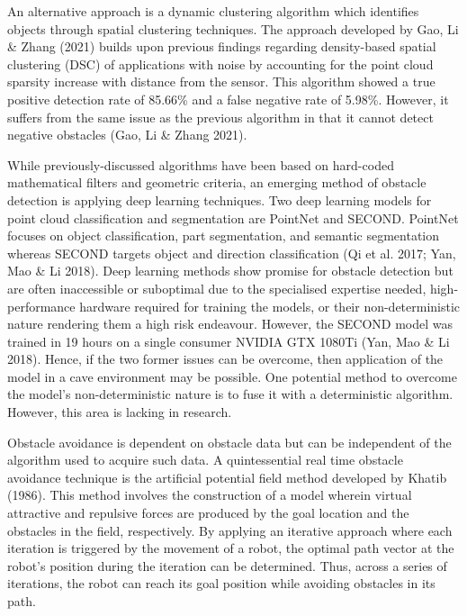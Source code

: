 An alternative approach is a dynamic clustering algorithm which identifies objects through spatial clustering techniques. The approach developed by Gao, Li \& Zhang (2021) builds upon previous findings regarding density-based spatial clustering (DSC) of applications with noise by accounting for the point cloud sparsity increase with distance from the sensor. This algorithm showed a true positive detection rate of 85.66\% and a false negative rate of 5.98\%. However, it suffers from the same issue as the previous algorithm in that it cannot detect negative obstacles (Gao, Li \& Zhang 2021).

While previously-discussed algorithms have been based on hard-coded mathematical filters and geometric criteria, an emerging method of obstacle detection is applying deep learning techniques. Two deep learning models for point cloud classification and segmentation are PointNet and SECOND. PointNet focuses on object classification, part segmentation, and semantic segmentation whereas SECOND targets object and direction classification (Qi et al. 2017; Yan, Mao \& Li 2018). Deep learning methods show promise for obstacle detection but are often inaccessible or suboptimal due to the specialised expertise needed, high-performance hardware required for training the models, or their non-deterministic nature rendering them a high risk endeavour. However, the SECOND model was trained in 19 hours on a single consumer NVIDIA GTX 1080Ti (Yan, Mao \& Li 2018). Hence, if the two former issues can be overcome, then application of the model in a cave environment may be possible. One potential method to overcome the model's non-deterministic nature is to fuse it with a deterministic algorithm. However, this area is lacking in research.  

Obstacle avoidance is dependent on obstacle data but can be independent of the algorithm used to acquire such data. A quintessential real time obstacle avoidance technique is the artificial potential field method developed by Khatib (1986). This method involves the construction of a model wherein virtual attractive and repulsive forces are produced by the goal location and the obstacles in the field, respectively. By applying an iterative approach where each iteration is triggered by the movement of a robot, the optimal path vector at the robot's position during the iteration can be determined. Thus, across a series of iterations, the robot can reach its goal position while avoiding obstacles in its path.

